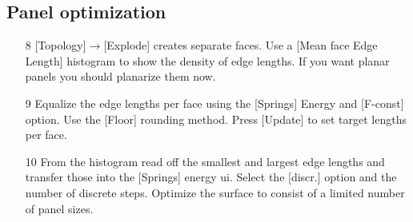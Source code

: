 \documentclass[Thesis.tex]{subfiles}
\begin{document}
\subsection{Panel optimization}

\begin{itemize}
\item[8] [Topology]$\to$[Explode] creates separate faces. Use a [Mean face Edge Length] histogram to show the density of edge lengths. If you want planar panels you should planarize them now.

\begin{center}
\begin{minipage}{0.9\linewidth}
            \centering
\end{minipage}
\end{center}

\item[9] Equalize the edge lengths per face using the [Springs] Energy and [F-const] option. Use the [Floor] rounding method. Press [Update] to set target lengths per face.

\begin{center}
\begin{minipage}{0.9\linewidth}
            \centering
\end{minipage}
\end{center}
\item[10] From the histogram read off the smallest and largest edge lengths and transfer those into the [Springs] energy ui. Select the [discr.] option and the number of discrete steps. Optimize the surface to consist of a limited number of panel sizes.

\begin{center}
\begin{minipage}{0.9\linewidth}
            \centering
\end{minipage}
\end{center}            
\end{itemize}
\end{document}

